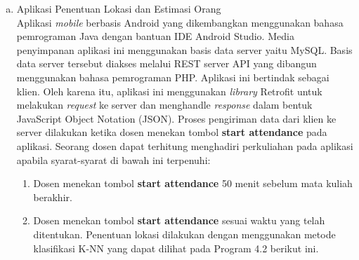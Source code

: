\begin{enumerate}[a.]
\begin{enumerate}[a.]
	\item Aplikasi Penentuan Lokasi dan Estimasi Orang
	      \\ Aplikasi \textit{mobile} berbasis Android yang dikembangkan menggunakan bahasa pemrograman Java dengan bantuan IDE Android Studio. Media penyimpanan aplikasi ini menggunakan basis data server yaitu MySQL. Basis data server tersebut diakses melalui REST server API yang dibangun menggunakan bahasa pemrograman PHP. Aplikasi ini bertindak sebagai klien. Oleh karena itu, aplikasi ini menggunakan \textit{library} Retrofit untuk melakukan \textit{request} ke server dan menghandle \textit{response} dalam bentuk JavaScript Object Notation (JSON). Proses pengiriman data dari klien ke server dilakukan ketika dosen menekan tombol \textbf{start attendance} pada aplikasi. %
	      Seorang dosen dapat terhitung menghadiri perkuliahan pada aplikasi apabila syarat-syarat di bawah ini terpenuhi:
	      \begin{enumerate}[1.]
		      \item Dosen menekan tombol \textbf{start attendance} 50 menit sebelum mata kuliah berakhir.
		      \item Dosen menekan tombol \textbf{start attendance} sesuai waktu yang telah ditentukan. Penentuan lokasi dilakukan dengan menggunakan metode klasifikasi K-NN yang dapat dilihat pada Program 4.2 berikut ini.
		            \vspace{0.4cm}


\end{enumerate}
\end{enumerate}
\end{enumerate}
